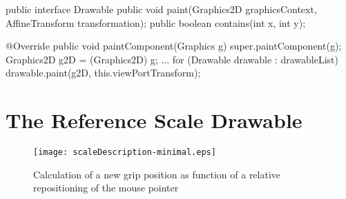 \documentclass[a4paper]{book}
\begin{document}
\begin{JAVA} [label=lst:Drawable,caption=The Drawable Interface all \texttt{Drawables} are implemented against]
public interface Drawable  {	
	public void paint(Graphics2D graphicsContext, AffineTransform transformation); 		
	public boolean contains(int x, int y);	
}
\end{JAVA}


\begin{JAVA} [label=lst:TEMView_paintComponent,caption=The transformation of the viewPort (\texttt{viewPortTransform: AffineTransform}) is used by the \texttt{paint} method to place the \texttt{Drawable} objects into TEMView's graphicsContext]
	@Override
	public void paintComponent(Graphics g) {
		super.paintComponent(g);
		Graphics2D g2D = (Graphics2D) g;
		...
		for (Drawable drawable : drawableList) {
			drawable.paint(g2D, this.viewPortTransform);
		}
	}
\end{JAVA}

\section{The Reference Scale Drawable}

    

	\begin{figure}[htbp]
  		\centering
  		\texttt{[image: scaleDescription-minimal.eps]}
  		\caption{Calculation of a new grip position as function of a relative repositioning of the mouse 	pointer}
	\end{figure}
\end{document}
